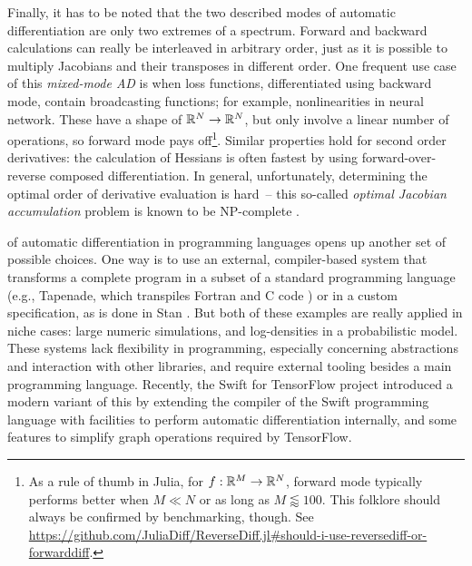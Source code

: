 Finally, it has to be noted that the two described modes of automatic differentiation are only two
extremes of a spectrum.  Forward and backward calculations can really be interleaved in arbitrary
order, just as it is possible to multiply Jacobians and their transposes in different order.  One
frequent use case of this \emph{mixed-mode AD} is when loss functions, differentiated using backward
mode, contain broadcasting functions; for example, nonlinearities in neural network.  These have a
shape of \(\mathbb{R}^N \to \mathbb{R}^N\), but only involve a linear number of operations, so forward mode pays
off\footnote{As a rule of thumb in Julia, for \(f: \mathbb{R}^M \to \mathbb{R}^N\), forward mode typically
  performs better when \(M \ll N\) or as long as \(M \lessapprox 100\).  This folklore should always
  be confirmed by benchmarking, though.  See
  \url{https://github.com/JuliaDiff/ReverseDiff.jl\#should-i-use-reversediff-or-forwarddiff}.}.
Similar properties hold for second order derivatives: the calculation of Hessians is often fastest
by using forward-over-reverse composed differentiation.  In general, unfortunately, determining the
optimal order of derivative evaluation is hard~-- this so-called \emph{optimal Jacobian
  accumulation} problem is known to be NP-complete \parencite{naumann2007optimal}.

 of automatic differentiation in programming languages
opens up another set of possible choices.  One way is to use an external, compiler-based system that
transforms a complete program in a subset of a standard programming language (e.g., Tapenade, which
transpiles Fortran and C code \parencite{tapenadedevelopers2019tapenade}) or in a custom
specification, as is done in Stan \parencite{carpenter2015stan}.  But both of these examples are
really applied in niche cases: large numeric simulations, and log-densities in a probabilistic
model.  These systems lack flexibility in programming, especially concerning abstractions and
interaction with other libraries, and require external tooling besides a main programming language.
Recently, the Swift for TensorFlow project \parencite{tensorflowdevelopers2018swift,hong2018graph}
introduced a modern variant of this by extending the compiler of the Swift programming language with
facilities to perform automatic differentiation internally, and some features to simplify graph
operations required by TensorFlow.

